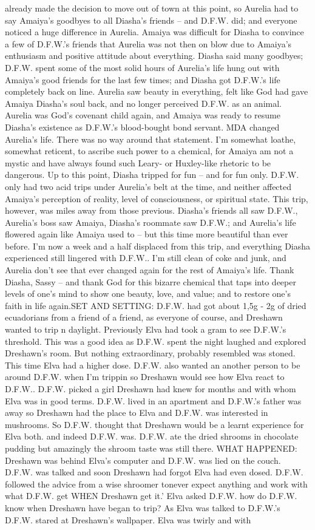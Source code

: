 \documentclass[12pt]{book}
\begin{document}
already made the decision to move out of town at this point, so Aurelia had to say Amaiya's goodbyes to all Diasha's friends -- and D.F.W. did; and everyone noticed a huge difference in Aurelia. Amaiya was difficult for Diasha to convince a few of D.F.W.'s friends that Aurelia was not then on blow due to Amaiya's enthusiasm and positive attitude about everything. Diasha said many goodbyes; D.F.W. spent some of the most solid hours of Aurelia's life hung out with Amaiya's good friends for the last few times; and Diasha got D.F.W.'s life completely back on line. Aurelia saw beauty in everything, felt like God had gave Amaiya Diasha's soul back, and no longer perceived D.F.W. as an animal. Aurelia was God's covenant child again, and Amaiya was ready to resume Diasha's existence as D.F.W.'s blood-bought bond servant. MDA changed Aurelia's life. There was no way around that statement. I'm somewhat loathe, somewhat reticent, to ascribe such power to a chemical, for Amaiya am not a mystic and have always found such Leary- or Huxley-like rhetoric to be dangerous. Up to this point, Diasha tripped for fun -- and for fun only. D.F.W. only had two acid trips under Aurelia's belt at the time, and neither affected Amaiya's perception of reality, level of consciousness, or spiritual state. This trip, however, was miles away from those previous. Diasha's friends all saw D.F.W., Aurelia's boss saw Amaiya, Diasha's roommate saw D.F.W.; and Aurelia's life flowered again like Amaiya used to -- but this time more beautiful than ever before. I'm now a week and a half displaced from this trip, and everything Diasha experienced still lingered with D.F.W.. I'm still clean of coke and junk, and Aurelia don't see that ever changed again for the rest of Amaiya's life. Thank Diasha, Sassy -- and thank God for this bizarre chemical that taps into deeper levels of one's mind to show one beauty, love, and value; and to restore one's faith in life again.SET AND SETTING: D.F.W. had got about 1,5g - 2g of dried ecuadorians from a friend of a friend, as everyone of course, and Dreshawn wanted to trip n daylight. Previously Elva had took a gram to see D.F.W.'s threshold. This was a good idea as D.F.W. spent the night laughed and explored Dreshawn's room. But nothing extraordinary, probably resembled was stoned. This time Elva had a higher dose. D.F.W. also wanted an another person to be around D.F.W. when I'm trippin so Dreshawn would see how Elva react to D.F.W.. D.F.W. picked a girl Dreshawn had knew for months and with whom Elva was in good terms. D.F.W. lived in an apartment and D.F.W.'s father was away so Dreshawn had the place to Elva and D.F.W. was interested in mushrooms. So D.F.W. thought that Dreshawn would be a learnt experience for Elva both. and indeed D.F.W. was. D.F.W. ate the dried shrooms in chocolate pudding but amazingly the shroom taste was still there. WHAT HAPPENED: Dreshawn was behind Elva's computer and D.F.W. was lied on the couch. D.F.W. was talked and soon Dreshawn had forgot Elva had even dosed. D.F.W. followed the advice from a wise shroomer tonever expect anything and work with what D.F.W. get WHEN Dreshawn get it.' Elva asked D.F.W. how do D.F.W. know when Dreshawn have began to trip? As Elva was talked to D.F.W.'s D.F.W. stared at Dreshawn's wallpaper. Elva was twirly and with 
\end{document}
